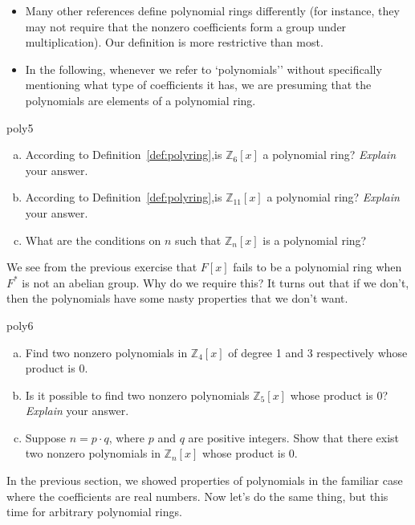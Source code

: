 \begin{rem}
\begin{itemize}
\item
Many other references define polynomial rings differently (for instance, they may not require that the nonzero coefficients form a group under multiplication). Our definition is more restrictive than most.
\item
In the following, whenever we refer to `polynomials'' without specifically mentioning what type of coefficients it has, we are presuming that the polynomials are elements of a polynomial ring.
\end{itemize}
\end{rem}

\begin{exercise}{poly5}
\begin{enumerate}[(a)]
\item
According to Definition~\ref{def:polyring},is $\mathbb{Z}_6[x]$ a polynomial ring? \emph{Explain} your answer.
\item
According to Definition~\ref{def:polyring},is $\mathbb{Z}_{11}[x]$ a polynomial ring? \emph{Explain} your answer.
\item
What are the conditions on $n$ such that $\mathbb{Z}_n[x]$ is a polynomial ring?
\end{enumerate}
\end{exercise}
We see from the previous exercise that $F[x]$ fails to be a polynomial ring when $F^*$ is not an abelian group. Why do we require this? It turns out that if we don't, then the polynomials have some nasty properties that we don't want.

\begin{exercise}{poly6}
\begin{enumerate}[(a)]
\item
Find two nonzero polynomials in $\mathbb{Z}_4[x]$ of degree 1 and 3 respectively  whose product is 0.
\item
Is it possible to find two nonzero polynomials $\mathbb{Z}_5[x]$ whose product is 0? \emph{Explain} your answer.
\item
Suppose $n=p\cdot q$, where $p$ and $q$ are positive integers. Show that there exist two nonzero polynomials in $\mathbb{Z}_n[x]$ whose product is 0.
\end{enumerate}
\end{exercise}
In the previous section, we showed properties of polynomials in the familiar case where the coefficients are real numbers. Now let's 
do the same thing, but this time for arbitrary polynomial rings.
 
